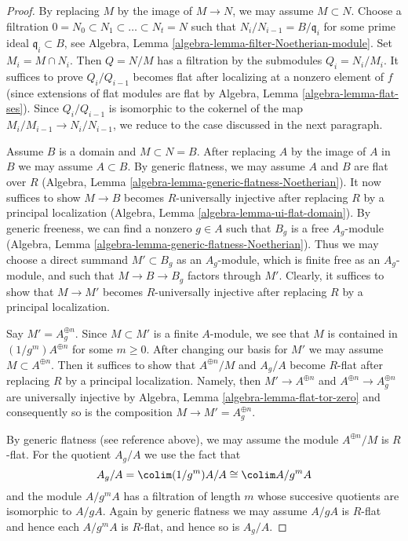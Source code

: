 \begin{proof}
By replacing $M$ by the image of $M \to N$, we may assume $M \subset N$.
Choose a filtration $0 = N_0 \subset N_1 \subset \ldots \subset N_t = N$
such that $N_i/N_{i - 1} = B/\mathfrak q_i$ for some prime ideal
$\mathfrak q_i \subset B$, see
Algebra, Lemma \ref{algebra-lemma-filter-Noetherian-module}.
Set $M_i = M \cap N_i$. Then $Q = N/M$ has a filtration by the submodules
$Q_i = N_i/M_i$. It suffices to prove $Q_i/Q_{i - 1}$ becomes flat
after localizing at a nonzero element of $f$ (since extensions of
flat modules are flat by Algebra, Lemma \ref{algebra-lemma-flat-ses}).
Since $Q_i/Q_{i - 1}$ is isomorphic to the  cokernel
of the map $M_i/M_{i - 1} \to N_i/N_{i - 1}$, we reduce to the
case discussed in the next paragraph.

\medskip\noindent
Assume $B$ is a domain and $M \subset N = B$. After replacing $A$ by the
image of $A$ in $B$ we may assume $A \subset B$. By generic flatness,
we may assume $A$ and $B$ are flat over $R$
(Algebra, Lemma \ref{algebra-lemma-generic-flatness-Noetherian}).
It now suffices to show $M \to B$ becomes $R$-universally
injective after replacing $R$ by a principal localization
(Algebra, Lemma \ref{algebra-lemma-ui-flat-domain}).
By generic freeness, we can find a nonzero $g \in A$ such that
$B_g$ is a free $A_g$-module
(Algebra, Lemma \ref{algebra-lemma-generic-flatness-Noetherian}).
Thus we may choose a direct summand $M' \subset B_g$ as an $A_g$-module,
which is finite free as an $A_g$-module, and
such that $M \to B \to B_g$ factors through $M'$.
Clearly, it suffices to show that $M \to M'$
becomes $R$-universally injective after replacing
$R$ by a principal localization.

\medskip\noindent
Say $M' = A_g^{\oplus n}$. Since $M \subset M'$ is a finite $A$-module,
we see that $M$ is contained in $(1/g^m)A^{\oplus n}$ for some $m \geq 0$.
After changing our basis for $M'$ we may assume $M \subset A^{\oplus n}$.
Then it suffices to show that $A^{\oplus n}/M$ and $A_g/A$ become
$R$-flat after replacing $R$ by a principal localization. Namely, then
$M' \to A^{\oplus n}$ and $A^{\oplus n} \to A_g^{\oplus n}$ are
universally injective by Algebra, Lemma \ref{algebra-lemma-flat-tor-zero}
and consequently so is the composition $M \to M' = A_g^{\oplus n}$.

\medskip\noindent
By generic flatness (see reference above), we may assume the
module $A^{\oplus n}/M$ is $R$-flat. For the quotient $A_g/A$
we use the fact that
$$
A_g/A = \colim (1/g^m)A/A \cong \colim A/g^mA
$$
and the module $A/g^mA$ has a filtration of length $m$ whose
succesive quotients are isomorphic to $A/gA$. Again by generic
flatness we may assume $A/gA$ is $R$-flat and hence each $A/g^mA$
is $R$-flat, and hence so is $A_g/A$.
\end{proof}

